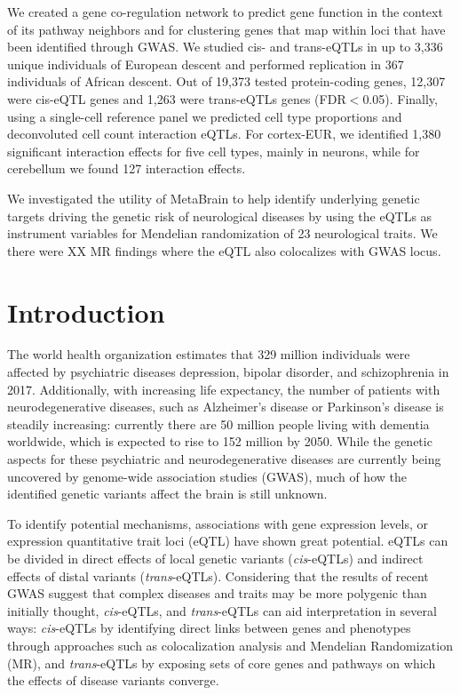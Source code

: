 We created a gene co-regulation network to predict gene function in the context of its pathway neighbors and for clustering genes that map within loci that have been identified through GWAS. We studied cis- and trans-eQTLs in up to 3,336 unique individuals of European descent and performed replication in 367 individuals of African descent. Out of 19,373 tested protein-coding genes, 12,307 were cis-eQTL genes and 1,263 were trans-eQTLs genes (FDR$<$0.05). Finally, using a single-cell reference panel we predicted cell type proportions and deconvoluted cell count interaction eQTLs. For cortex-EUR, we identified 1,380 significant interaction effects for five cell types, mainly in neurons, while for cerebellum we found 127 interaction effects. 

We investigated the utility of MetaBrain to help identify underlying genetic targets driving the genetic risk of neurological diseases by using the eQTLs as instrument variables for Mendelian randomization of 23 neurological traits. We there were XX MR findings where the eQTL also colocalizes with GWAS locus. 

\section{Introduction}
The world health organization estimates that 329 million individuals were affected by psychiatric diseases depression, bipolar disorder, and schizophrenia in 2017\cite{jamesGlobalRegionalNational2018}. Additionally, with increasing life expectancy, the number of patients with neurodegenerative diseases, such as Alzheimer’s disease or Parkinson’s disease is steadily increasing: currently there are 50 million people living with dementia worldwide, which is expected to rise to 152 million by 2050\cite{WorldAlzheimerReport}. While the genetic aspects for these psychiatric and neurodegenerative diseases are currently being uncovered by genome-wide association studies (GWAS), much of how the identified genetic variants affect the brain is still unknown. 

To identify potential mechanisms, associations with gene expression levels, or expression quantitative trait loci (eQTL) have shown great potential. eQTLs can be divided in direct effects of local genetic variants (\emph{cis}-eQTLs) and indirect effects of distal variants (\emph{trans}-eQTLs). Considering that the results of recent GWAS suggest that complex diseases and traits may be more polygenic than initially thought, \emph{cis}-eQTLs, and \emph{trans}-eQTLs can aid interpretation in several ways: \emph{cis}-eQTLs by identifying direct links between genes and phenotypes through approaches such as colocalization analysis and Mendelian Randomization (MR), and \emph{trans}-eQTLs by exposing sets of core genes and pathways on which the effects of disease variants converge.  

